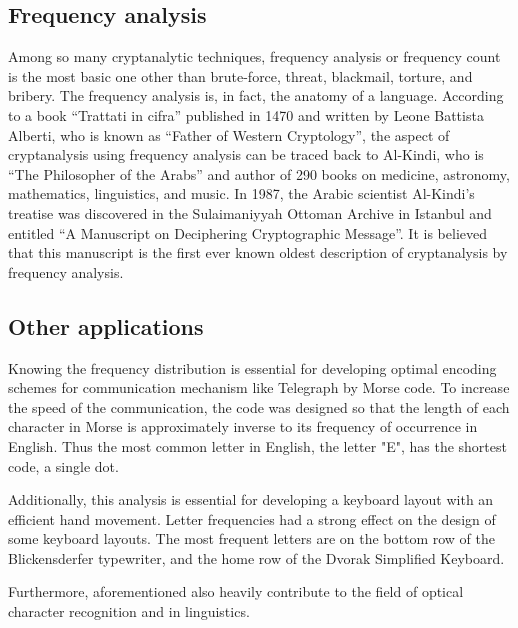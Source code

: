 \subsection{Frequency analysis}
Among so many cryptanalytic techniques, frequency analysis or frequency count is the most basic one other than brute-force, threat, blackmail, torture, and bribery. The frequency analysis is, in fact, the anatomy of a language. According to a book “Trattati in cifra” published in 1470 and written by Leone Battista Alberti, who is known as “Father of Western Cryptology”, the aspect of cryptanalysis using frequency analysis can be traced back to Al-Kindi, who is “The Philosopher of the Arabs” and author of 290 books on medicine, astronomy, mathematics, linguistics, and music. In 1987, the Arabic scientist Al-Kindi’s treatise was discovered in the Sulaimaniyyah Ottoman Archive in Istanbul and entitled “A Manuscript on Deciphering Cryptographic Message”. It is believed that this manuscript is the first ever known oldest description of cryptanalysis by frequency analysis\cite{decrypting_english_enhanced}.

\subsection{Other applications}
Knowing the frequency distribution is essential for developing optimal encoding schemes for communication mechanism like Telegraph by Morse code. To increase the speed of the communication, the code was designed so that the length of each character in Morse is approximately inverse to its frequency of occurrence in English. Thus the most common letter in English, the letter "E", has the shortest code, a single dot\cite{morse_code}.

Additionally, this analysis is essential for developing a keyboard layout with an efficient hand movement. Letter frequencies had a strong effect on the design of some keyboard layouts. The most frequent letters are on the bottom row of the Blickensderfer typewriter, and the home row of the Dvorak Simplified Keyboard\cite{bbc_qwerty}\cite{qwerty_review}. 

Furthermore, aforementioned also heavily contribute to the field of optical character recognition and in linguistics.
